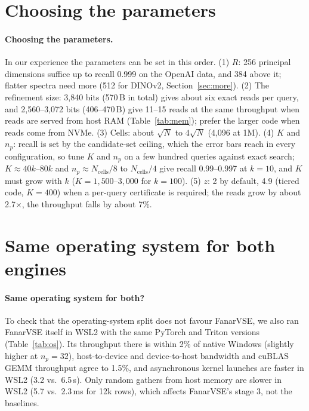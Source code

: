 \documentclass[10pt]{article}
\begin{document}
\section{Choosing the parameters}\label{sn:params}
\paragraph{Choosing the parameters.} In our experience the parameters can be set in this order. (1) $R$: 256 principal dimensions suffice up to recall 0.999 on the OpenAI data, and 384 above it; flatter spectra need more (512 for DINOv2, Section~\ref{sec:more}). (2) The refinement size: 3{,}840 bits (570\,B in total) gives about six exact reads per query, and 2{,}560--3{,}072 bits (406--470\,B) give 11--15 reads at the same throughput when reads are served from host RAM (Table~\ref{tab:mem}); prefer the larger code when reads come from NVMe. (3) Cells: about $\sqrt{N}$ to $4\sqrt{N}$ (4{,}096 at 1M). (4) $K$ and $n_p$: recall is set by the candidate-set ceiling, which the error bars reach in every configuration, so tune $K$ and $n_p$ on a few hundred queries against exact search; $K\approx40k$--$80k$ and $n_p\approx N_{\mathrm{cells}}/8$ to $N_{\mathrm{cells}}/4$ give recall 0.99--0.997 at $k=10$, and $K$ must grow with $k$ ($K=1{,}500$--$3{,}000$ for $k=100$). (5) $z$: 2 by default, 4.9 (tiered code, $K=400$) when a per-query certificate is required; the reads grow by about 2.7$\times$, the throughput falls by about 7\%.

\section{Same operating system for both engines}\label{sn:os}
\paragraph{Same operating system for both?} To check that the operating-system split does not favour FanarVSE, we also ran FanarVSE itself in WSL2 with the same PyTorch and Triton versions (Table~\ref{tab:os}). Its throughput there is within 2\% of native Windows (slightly higher at $n_p=32$), host-to-device and device-to-host bandwidth and cuBLAS GEMM throughput agree to 1.5\%, and asynchronous kernel launches are faster in WSL2 (3.2 vs.\ 6.5\,\textmu s). Only random gathers from host memory are slower in WSL2 (5.7 vs.\ 2.3\,ms for 12k rows), which affects FanarVSE's stage 3, not the baselines.
\end{document}
